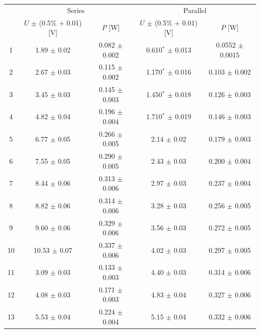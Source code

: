 \documentclass[a4paper]{article}
\begin{document}
\begin{table}[H]
	\centering
	\begin{tabular}{c||cc|cc}
		\hline
		   & \multicolumn{2}{c|}{Series}  & \multicolumn{2}{c}{Parallel}                                                      \\
		   & $U$ $\pm$ (0.5\% + 0.01) [V] & $P$ [W]                      & $U$ $\pm$ (0.5\% + 0.01) [V] & $P$ [W]             \\
		\hline
		1  & 1.89  $\pm$ 0.02             & 0.082  $\pm$ 0.002           & 0.610$^*$   $\pm$ 0.013           & 0.0552 $\pm$ 0.0015 \\
		2  & 2.67  $\pm$ 0.03             & 0.115  $\pm$ 0.002           & 1.170$^*$   $\pm$ 0.016           & 0.103  $\pm$ 0.002  \\
		3  & 3.45  $\pm$ 0.03             & 0.145  $\pm$ 0.003           & 1.450$^*$   $\pm$ 0.018           & 0.126  $\pm$ 0.003  \\
		4  & 4.82  $\pm$ 0.04             & 0.196  $\pm$ 0.004           & 1.710$^*$   $\pm$ 0.019           & 0.146  $\pm$ 0.003  \\
		5  & 6.77  $\pm$ 0.05             & 0.266  $\pm$ 0.005           & 2.14   $\pm$ 0.02            & 0.179  $\pm$ 0.003  \\
		6  & 7.55  $\pm$ 0.05             & 0.290  $\pm$ 0.005           & 2.43   $\pm$ 0.03            & 0.200  $\pm$ 0.004  \\
		7  & 8.44  $\pm$ 0.06             & 0.313  $\pm$ 0.006           & 2.97   $\pm$ 0.03            & 0.237  $\pm$ 0.004  \\
		8  & 8.82  $\pm$ 0.06             & 0.314  $\pm$ 0.006           & 3.28   $\pm$ 0.03            & 0.256  $\pm$ 0.005  \\
		9  & 9.60  $\pm$ 0.06             & 0.329  $\pm$ 0.006           & 3.56   $\pm$ 0.03            & 0.272  $\pm$ 0.005  \\
		10 & 10.53 $\pm$ 0.07             & 0.337  $\pm$ 0.006           & 4.02   $\pm$ 0.03            & 0.297  $\pm$ 0.005  \\
		11 & 3.09  $\pm$ 0.03             & 0.133  $\pm$ 0.003           & 4.40   $\pm$ 0.03            & 0.314  $\pm$ 0.006  \\
		12 & 4.08  $\pm$ 0.03             & 0.171  $\pm$ 0.003           & 4.83   $\pm$ 0.04            & 0.327  $\pm$ 0.006  \\
		13 & 5.53  $\pm$ 0.04             & 0.224  $\pm$ 0.004           & 5.15   $\pm$ 0.04            & 0.332  $\pm$ 0.006  \\

\end{tabular}
\end{table}
\end{document}
